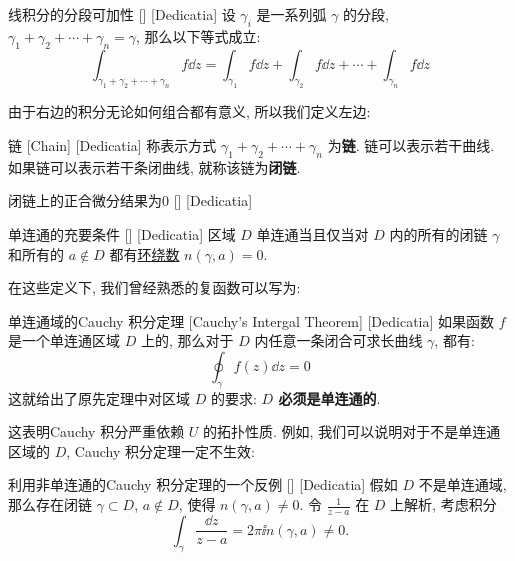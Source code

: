 \documentclass[UTF8]{ctexart}
\begin{document}
        \begin{ppt}
            [UUID]
            {线积分的分段可加性}
            []
            [Dedicatia]
            设 \(\gamma_i\) 是一系列弧 \(\gamma\) 的分段,  \(\gamma_1+\gamma_2+\cdots+\gamma_n=\gamma\), 那么以下等式成立: 
            \[\int_{\gamma_1+\gamma_2+\cdots+\gamma_n}f\dd{z}=\int_{\gamma_1}f\dd{z}+\int_{\gamma_2}f\dd{z}+\cdots+\int_{\gamma_n}f\dd{z}\]
        \end{ppt}

        由于右边的积分无论如何组合都有意义, 所以我们定义左边: 

        \begin{dfn}
            [UUID]
            {链}
            [Chain]
            [Dedicatia]
            称表示方式 \(\gamma_1+\gamma_2+\cdots+\gamma_n\) 为\textbf{链}. 链可以表示若干曲线. 如果链可以表示若干条闭曲线, 就称该链为\textbf{闭链}. 
        \end{dfn}

        \begin{ppt}
            [UUID]
            {闭链上的正合微分结果为0}
            []
            [Dedicatia]
        \end{ppt}

        \begin{thm}
            [UUID]
            {单连通的充要条件}
            []
            [Dedicatia]
            区域 \(D\) 单连通当且仅当对 \(D\) 内的所有的闭链 \(\gamma\) 和所有的 \(a\notin D\) 都有\hyperref[dfn:WindingNumber]{环绕数} \(n(\gamma,a)=0\).
        \end{thm}

        在这些定义下, 我们曾经熟悉的复函数可以写为: 

        \begin{thm}
            [UUID]
            {单连通域的Cauchy 积分定理}
            [Cauchy's Intergal Theorem]
            [Dedicatia]
            如果函数 \(f\) 是一个单连通区域 \(D\) 上的, 那么对于 \(D\) 内任意一条闭合可求长曲线 \(\gamma\), 都有: 
            \[\oint_{\gamma} f(z) \dd z = 0\]
            这就给出了原先定理中对区域 \(D\) 的要求: \textbf{ \(D\) 必须是单连通的}. 
        \end{thm}

        这表明Cauchy 积分严重依赖 \(U\) 的拓扑性质. 例如, 我们可以说明对于不是单连通区域的 \(D\), Cauchy 积分定理一定不生效: 

        \begin{cxmp}
            [UUID]
            {利用非单连通的Cauchy 积分定理的一个反例}
            []
            [Dedicatia]
            假如 \(D\) 不是单连通域, 那么存在闭链 \(\gamma\subset D\),  \(a\notin D\), 使得 \(n(\gamma,a)\neq 0\). 令 \(\frac{1}{z-a}\) 在 \(D\) 上解析, 考虑积分
            \[\int_\gamma\frac{\dd{z}}{z-a}=2\pi\ii n(\gamma,a)\neq 0.\]
        \end{cxmp}
\end{document}
